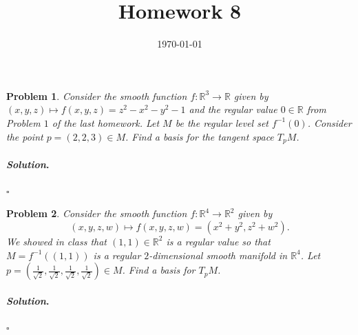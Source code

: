 \documentclass[reqno]{amsart}
\theoremstyle{plain}
\newtheorem{problem}{Problem}
\theoremstyle{definition}
\newenvironment{solution}{\paragraph{\emph{Solution}.}}{\hfill$\square$}
\begin{document}
 

\title[Homework 8]{Homework 8}

\date{\today} 
\maketitle 

\begin{problem}
Consider the smooth function $f:\mathbb{R}^{3} \rightarrow \mathbb{R}$ given by $(x,y,z) \mapsto f(x,y,z) = z^{2} - x^{2} - y^{2} -1$ and the regular value $0 \in \mathbb{R}$ from Problem $1$ of the last homework.  Let $M$ be the regular level set $f^{-1}(0)$.  Consider the point $p=(2,2,3) \in M$.  Find a basis for the tangent space $T_{p}M$.
\end{problem}

\begin{solution}

\end{solution}

\begin{problem}
Consider the smooth function $f:\mathbb{R}^{4} \rightarrow \mathbb{R}^{2}$ given by 
$$(x,y,z,w) \mapsto f(x,y,z,w) = (x^{2}+y^{2},z^{2}+w^{2}).$$  
We showed in class that $(1,1) \in \mathbb{R}^{2}$ is a regular value so that $M = f^{-1}((1,1))$ is a regular $2$-dimensional smooth manifold in $\mathbb{R}^{4}$.  Let $p = \left(\frac{1}{\sqrt{2}},\frac{1}{\sqrt{2}},\frac{1}{\sqrt{2}},\frac{1}{\sqrt{2}} \right) \in M$.  Find a basis for $T_{p}M$.
\end{problem}

\begin{solution}

\end{solution}
\end{document}
